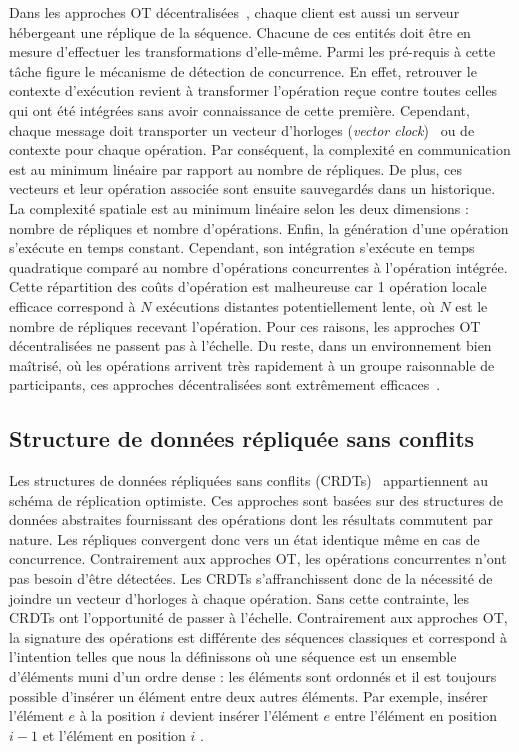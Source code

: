 Dans les approches OT décentralisées~\cite{sun2009contextbased}, chaque client
est aussi un serveur hébergeant une réplique de la séquence. Chacune de ces
entités doit être en mesure d'effectuer les transformations d'elle-même. Parmi
les pré-requis à cette tâche figure le mécanisme de détection de concurrence. En
effet, retrouver le contexte d'exécution revient à transformer l'opération reçue
contre toutes celles qui ont été intégrées sans avoir connaissance de cette
première. Cependant, chaque message doit transporter un vecteur d'horloges
(\emph{vector clock})~\cite{lamport1978time} ou de contexte pour chaque
opération. Par conséquent, la complexité en communication est au minimum
linéaire par rapport au nombre de répliques. De plus, ces vecteurs et leur
opération associée sont ensuite sauvegardés dans un historique. La complexité
spatiale est au minimum linéaire selon les deux dimensions : nombre de répliques
et nombre d'opérations. Enfin, la génération d'une opération s'exécute en temps
constant. Cependant, son intégration s'exécute en temps quadratique comparé au
nombre d'opérations concurrentes à l'opération intégrée. Cette répartition des
coûts d'opération est malheureuse car 1 opération locale efficace correspond à
$N$ exécutions distantes potentiellement lente, où $N$ est le nombre de
répliques recevant l'opération. Pour ces raisons, les approches OT
décentralisées ne passent pas à l'échelle. Du reste, dans un environnement bien
maîtrisé, où les opérations arrivent très rapidement à un groupe raisonnable de
participants, ces approches décentralisées sont extrêmement
efficaces~\cite{mehdi2014merging}.

\subsection{Structure de données répliquée sans conflits}
\label{repl:subsec:crdts}

Les structures de données répliquées sans conflits
(CRDTs)~\cite{shapiro2011comprehensive, shapiro2011conflict} appartiennent au
schéma de réplication optimiste. Ces approches sont basées sur des structures de
données abstraites fournissant des opérations dont les résultats commutent par
nature. Les répliques convergent donc vers un état identique même en cas de
concurrence. Contrairement aux approches OT, les opérations concurrentes n'ont
pas besoin d'être détectées. Les CRDTs s'affranchissent donc de la nécessité de
joindre un vecteur d'horloges à chaque opération. Sans cette contrainte, les
CRDTs ont l'opportunité de passer à l'échelle. Contrairement aux approches OT,
la signature des opérations est différente des séquences \og classiques \fg et
correspond à l'intention telles que nous la définissons où une séquence est un
ensemble d'éléments muni d'un ordre dense : les éléments sont ordonnés et il est
toujours possible d'insérer un élément entre deux autres éléments. Par exemple,
\og insérer l'élément $e$ à la position $i$ \fg devient \og insérer l'élément
$e$ entre l'élément en position $i-1$ et l'élément en position $i$ \fg.

